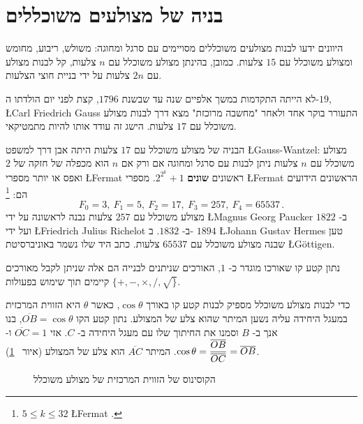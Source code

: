 \section{בניה של מצולעים משוכללים}\label{s.hept-regular}

היוונים ידעו לבנות מצולעים משוכללים מסויימים  עם סרגל ומחוגה: משולש, ריבוע, מחומש ומצולע משוכלל עם $15$ צלעות.
כמובן, בהינתן מצולע משוכלל עם
$n$
צלעות, קל לבנות מצולע עם 
$2n$
צלעות על ידי בניית חוצי הצלעות.

לא הייתה התקדמות במשך אלפיים שנה עד שבשנת
$1796$,
קצת לפני יום הולדתו ה-$19$,
\L{Carl Friedrich Gauss}
התעורר בוקר אחד ולאחר "מחשבה מרוכזת" מצא דרך לבנות מצולע משוכלל עם 
$17$
צלעות. הישג זה עודד אותו להיות מתמטיקאי.

הבניה של מצולע משוכלל עם 
$17$
צלעות היתה אבן דרך למשפט
\L{Gauss-Wantzel}:
מצולע משוכלל עם 
$n$
צלעות ניתן לבנות עם סרגל ומחוגה אם ורק אם 
$n$
הוא מכפלה של חזקה של
$2$
ואפס או יותר מספרי 
\L{Fermat}
ראשונים
\textbf{שונים}
$2^{2^k}+1$.
מספרי 
\L{Fermat}
הראשונים הידועים הם:%
\footnote{%
$5\leq k \leq 32$
\L{Fermat}
.}
\[
F_0=3,\: F_1=5,\: F_2=17,\: F_3=257,\: F_4=65537\,.
\]
מצולע משוכלל עם
$257$
צלעות נבנה לראשונה על ידי
\L{Magnus Georg Paucker}
ב-%
$1822$
ועל ידי
\L{Friedrich Julius Richelot}
ב-%
$1832$.
ב-%
$1894$
\L{Johann Gustav Hermes}
טען שבנה מצולע משוכלל עם
$65537$
צלעות.
כתב היד שלו נשמר באוניברסיטת 
\L{G\"{o}ttigen}.

נתון קטע קו שאורכו מוגדר כ-%
$1$,
האורכים שניתנים לבנייה הם אלה שניתן לקבל מאורכים קיימים תוך שימוש בפעולות 
$\{+,-,\times,/,\surd\}$.

כדי לבנות מצולע משוכלל מספיק לבנות קטע קו באורך 
$\cos \theta$,
כאשר
$\theta$ 
היא הזווית המרכזית במעגל היחידה עליה נשען המיתר שהוא צלע של המצולע. נתון קטע הקו
$\overline{OB}=\cos\theta$,
בנו אנך ב-%
$B$
וסמנו את החיתוך שלו עם מעגל היחידה ב-%
$C$.
אזי
$\overline{OC}=1$
ו-%
$\cos \theta=\displaystyle\frac{\overline{OB}}{\overline{OC}}=\overline{OB}$.
המיתר 
$\overline{AC}$
הוא צלע של המצולע (איור%
~\ref{f.hept-central1}).

\begin{figure}[htb]
\begin{center}
\caption{הקוסינוס של הזווית המרכזית של מצולע משוכלל}
\label{f.hept-central1}
\end{center}
\end{figure}

